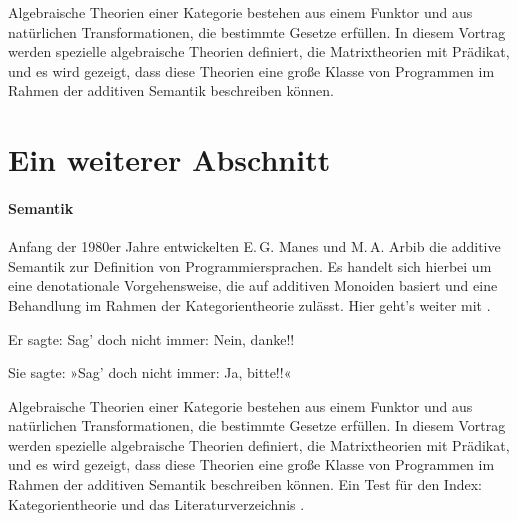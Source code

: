 Algebraische Theorien einer Kategorie bestehen aus einem Funktor und
aus natürlichen Transformationen, die bestimmte Gesetze erfüllen. In
diesem Vortrag werden spezielle algebraische Theorien definiert, die
Matrixtheorien mit Prädikat, und es wird gezeigt, dass diese Theorien
eine große Klasse von Programmen im Rahmen der additiven Semantik
beschreiben können.

\section{Ein weiterer Abschnitt}

\paragraph{Semantik}

Anfang der 1980er Jahre entwickelten E.\,G. Manes und M.\,A. Arbib die
additive Semantik zur Definition von Programmiersprachen. Es handelt
sich hierbei um eine denotationale Vorgehensweise, die auf additiven
Monoiden basiert und eine Behandlung im Rahmen der Kategorientheorie
zulässt. Hier geht's weiter mit \cite{lit01}.\gruppe\abelsch

Er sagte: {\glqq}Sag' doch nicht immer: {\glq}Nein, danke!{\grq}!{\grqq}

Sie sagte: »Sag' doch nicht immer: {\frq}Ja, bitte!{\flq}!«

Algebraische Theorien einer Kategorie bestehen aus einem Funktor und
aus natürlichen Transformationen, die bestimmte Gesetze erfüllen. In
diesem Vortrag werden spezielle algebraische Theorien definiert, die
Matrixtheorien mit Prädikat, und es wird gezeigt, dass diese Theorien
eine große Klasse von Programmen im Rahmen der additiven Semantik
beschreiben können. Ein Test für den Index:
Kategorientheorie und
das Literaturverzeichnis \cite{lit02,lit03}.

\endinput
